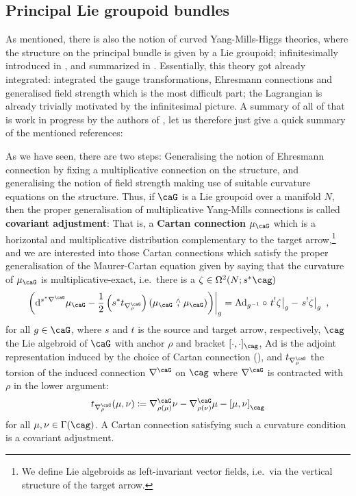 \documentclass[reqno,a4paper,oneside]{amsart}
\newcommand\mutot{\mu_\caG}
\theoremstyle{plain}
\theoremstyle{remark}
\theoremstyle{definition}
\DeclareMathOperator{\sAd}{\mathKel{A\mkern-5.5mu d}}
\begin{document}
\subsection{Principal Lie groupoid bundles}

As mentioned, there is also the notion of curved Yang-Mills-Higgs theories, where the structure on the principal bundle is given by a Lie groupoid; infinitesimally introduced in \cite{CurvedYMH}, and summarized in \cite{MyThesis}. Essentially, this theory got already integrated: \cite{Fischer:2024vak} integrated the gauge transformations, Ehresmann connections and generalised field strength which is the most difficult part; the Lagrangian is already trivially motivated by the infinitesimal picture. A summary of all of that is work in progress by the authors of \cite{Fischer:2024vak}, let us therefore just give a quick summary of the mentioned references:

As we have seen, there are two steps: Generalising the notion of Ehresmann connection by fixing a multiplicative connection on the structure, and generalising the notion of field strength making use of suitable curvature equations on the structure. Thus, if $\caG$ is a Lie groupoid over a manifold $N$, then the proper generalisation of multiplicative Yang-Mills connections is called \textbf{covariant adjustment}: That is, a \textbf{Cartan connection} $\mutot$ which is a horizontal and multiplicative distribution complementary to the target arrow,\footnote{We define Lie algebroids as left-invariant vector fields, i.e.\ via the vertical structure of the target arrow.} and we are interested into those Cartan connections which satisfy the proper generalisation of the Maurer-Cartan equation given by saying that the curvature of $\mutot$ is multiplicative-exact, i.e.\ there is a $\zeta \in \Omega^2(N; s^*\cag)$
\begin{equation*}
		\left.\left(\mathrm{d}^{s^*\nabla^\caG} \mutot
		- \frac{1}{2} \left(s^*t_{\nabla^\caG_\rho}\right)\left( \mutot \stackrel{\wedge}{,} \mutot \right) \right) \right|_{g}
		=
		\mathrm{Ad}_{g^{-1}}\circ \left.t^! \zeta\right|_g 
		- \left.s^! \zeta\right|_g~,
\end{equation*}
for all $g \in \caG$, where $s$ and $t$ is the source and target arrow, respectively, $\cag$ the Lie algebroid of $\caG$ with anchor $\rho$ and bracket $[\cdot, \cdot]_\cag$, $\mathrm{Ad}$ is the adjoint representation induced by the choice of Cartan connection (\cite{crainic2015multiplicative}), and $t_{\nabla^\caG_\rho}$ the torsion of the induced connection $\nabla^\caG$ on $\cag$ where $\nabla^\caG$ is contracted with $\rho$ in the lower argument:
\begin{equation*}
t_{\nabla^\caG_\rho}(\mu, \nu)
\coloneqq
\nabla^\caG_{\rho(\mu)}\nu
	- \nabla^\caG_{\rho(\nu)}\mu
	- \mleft[ \mu, \nu \mright]_\cag
\end{equation*}
for all $\mu, \nu \in \Gamma(\cag)$.
A Cartan connection satisfying such a curvature condition is a covariant adjustment. 
\end{document}
